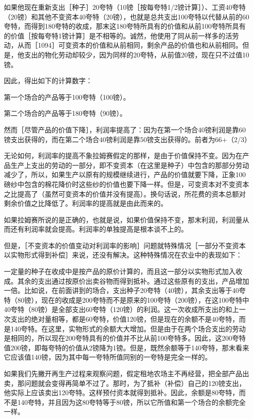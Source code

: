 如果他现在重新支出［种子］20夸特（10镑［按每夸特1/2镑计算］）、工资40夸特（20镑）和其他不变资本40夸特（20镑），也就是总共支出100夸特以代替从前的60夸特，而得到180夸特的收成，那末这180夸特所具有的价值和从前100夸特所具有的价值［按每夸特1镑计算］是不相等的。诚然，他使用了同从前一样多的活劳动，从而［1094］可变资本的价值和从前相同，剩余产品的价值也和从前相同。但是，他支出的物化劳动却较少，因为同样的20夸特，从前值20镑，现在只不过值10镑。

因此，得出如下的计算数字：

\todo{}

第一个场合的产品等于100夸特（100镑）。

第二个场合的产品等于180夸特（90镑）。

然而［尽管产品的价值下降］，利润率提高了：因为在第一个场合40镑利润是靠60镑支出获得的，而在第二个场合40镑利润是靠50镑支出获得的。前者为66+（2/3）%

无论如何，利润率的提高不象拉姆赛假定的那样，是由于价值保持不变。因为在产品生产上支出的劳动的一部分，即不变资本（在这里是种子）中包含的那部分劳动减少了，所以，如果生产以原有的规模继续进行，产品的价值就要下降，正象100磅纱中包含的棉花降价时这些纱的价值也要下降一样。但是，可变资本对不变资本之比提高了（虽然可变资本的价值并没有提高）。换句话说，所花费的资本总额对剩余价值之比降低了。利润率的提高就是由此而来的。

如果拉姆赛所说的是正确的，也就是说，如果价值保持不变，那末利润，利润量从而还有利润率就会提高。利润率的单独提高是根本谈不上的。

但是，［不变资本的价值变动对利润率的影响］问题就特殊情况［一部分不变资本以实物形式得到补偿］来说，还没有解决。这种特殊情况在农业中的表现如下：

一定量的种子在收成中是按产品的原价计算的，而且这一部分以实物形式加入收成。其余的支出通过按原价出卖谷物而得到抵补。通过这些原有的支出，产品增加一倍。比如说，在前面讲到的场合，支出种子20夸特（40镑），其余支出等于40夸特（80镑），现在的收成是200夸特而不是原来的100夸特（200镑），在这100夸特中40夸特（80镑）是全部支出60夸特（120镑）的利润。这一次收成所支出的和上一次支出的绝对量相等，都是60夸特，价值120镑，但是现在的余额不是40夸特，而是140夸特。在这里，实物形式的余额大大增加。但是由于在两个场合支出的劳动是相同的，所以现在200夸特具有的价值并不比从前100夸特多。因此，这200夸特值200镑，即每夸特的价值从2镑降为1镑。但是，既然余额等于140夸特，那末看来它应该值140镑，因为其中每一夸特所值同别的一夸特是完全一样的。

如果我们先撇开再生产过程来观察问题，假定租地农场主不再经营，把全部产品出卖，那问题就会变得再简单不过了。那时，为了抵补（补偿）自己的120镑支出，他实际上应该卖出120夸特。这样预付资本就得到抵补。因此，余额是80夸特，而不是140夸特，并且因为这80夸特等于80镑，所以它所值和第一个场合的余额完全一样。


